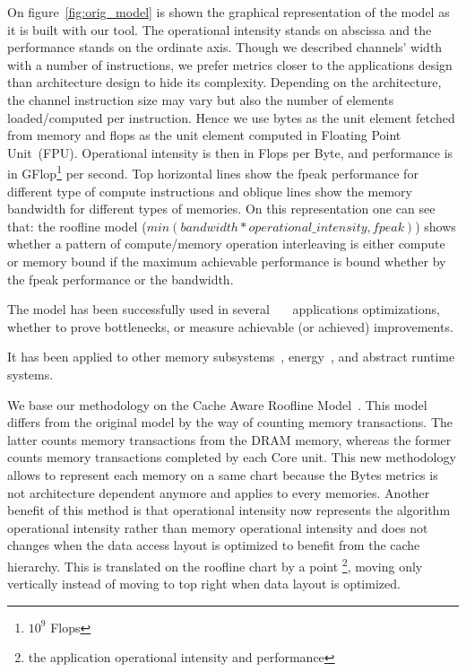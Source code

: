 \documentclass[twoside,twocolumn,8pt]{extarticle}
\begin{document}
On figure~\ref{fig:orig_model} is shown the graphical representation of the model as it is built with our tool.
The operational intensity stands on abscissa and the performance stands on the ordinate axis.
Though we described channels' width with a number of instructions, we prefer metrics closer to the applications design than
architecture design to hide its complexity.
Depending on the architecture, the channel instruction size may vary but also the number of elements loaded/computed per
instruction.
Hence we use bytes as the unit element fetched from memory and flops as the unit element computed in Floating Point Unit~(FPU).
Operational intensity is then in Flops per Byte, and performance is in GFlop\footnote{$10^9$ Flops} per second.
Top horizontal lines show the fpeak performance for different type of compute instructions and
oblique lines show the memory bandwidth for different types of memories. On this representation
one can see that: the roofline model ($min(bandwidth*operational\_intensity, fpeak)$) shows whether a pattern of compute/memory
operation interleaving is either compute or memory bound if the maximum achievable performance is bound whether by the fpeak
performance or the bandwidth.

The model has been successfully used in
several~\cite{Kim20111201}~\cite{Rossinelli2164}~\cite{vanNieuwpoort:2009:UMH:1542275.1542337} applications optimizations, whether
to prove bottlenecks, or measure achievable (or achieved) improvements.

It has been applied to other memory subsystems~\cite{ilic2014cache}, energy~\cite{7493653}, and abstract runtime systems.

We base our methodology on the Cache Aware Roofline Model~\cite{ilic2014cache}.
This model differs from the original model by the way of counting memory transactions.
The latter counts memory transactions from the DRAM memory, whereas the former counts memory transactions completed by each
Core unit.
This new methodology allows to represent each memory on a same chart because the Bytes metrics is not architecture dependent
anymore and applies to every memories.
Another benefit of this method is that operational intensity now represents the algorithm operational intensity rather than memory
operational intensity and does not changes when the data access layout is optimized to benefit from the cache hierarchy.
This is translated on the roofline chart by a point \footnote{the application operational intensity and performance}, moving only
vertically instead of moving to top right when data layout is optimized.
\end{document}
